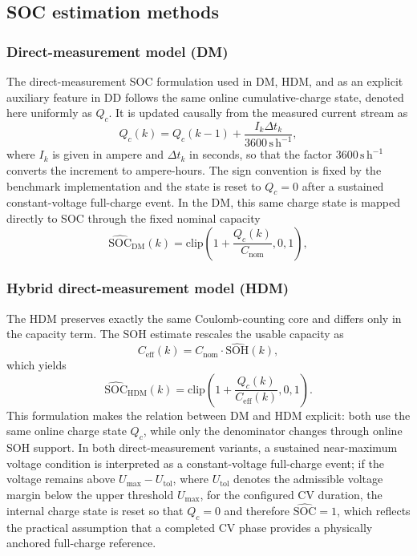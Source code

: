 \documentclass[review,nopreprintline]{elsarticle}
\begin{document}
\subsection{SOC estimation methods}
\subsubsection{Direct-measurement model (DM)}
The direct-measurement SOC formulation used in DM, HDM, and as an explicit auxiliary feature in DD follows the same online cumulative-charge state, denoted here uniformly as $Q_c$. It is updated causally from the measured current stream as
\begin{equation}
    Q_c(k)=Q_c(k-1)+\frac{I_k \Delta t_k}{3600\,\mathrm{s\,h^{-1}}},
    \label{eq:qc_update}
\end{equation}
where $I_k$ is given in ampere and $\Delta t_k$ in seconds, so that the factor $3600\,\mathrm{s\,h^{-1}}$ converts the increment to ampere-hours. The sign convention is fixed by the benchmark implementation and the state is reset to $Q_c=0$ after a sustained constant-voltage full-charge event. In the DM, this same charge state is mapped directly to SOC through the fixed nominal capacity
\begin{equation}
    \widehat{\mathrm{SOC}}_{\mathrm{DM}}(k)=\mathrm{clip}\!\left(1+\frac{Q_c(k)}{C_{\mathrm{nom}}},0,1\right),
    \label{eq:soc_dm}
\end{equation}

\subsubsection{Hybrid direct-measurement model (HDM)}
The HDM preserves exactly the same Coulomb-counting core and differs only in the capacity term. The SOH estimate rescales the usable capacity as
\begin{equation}
    C_{\mathrm{eff}}(k)=C_{\mathrm{nom}} \cdot \widehat{\mathrm{SOH}}(k),
    \label{eq:ceff}
\end{equation}
which yields
\begin{equation}
    \widehat{\mathrm{SOC}}_{\mathrm{HDM}}(k)=\mathrm{clip}\!\left(1+\frac{Q_c(k)}{C_{\mathrm{eff}}(k)},0,1\right).
    \label{eq:soc_hdm}
\end{equation}
This formulation makes the relation between DM and HDM explicit: both use the same online charge state $Q_c$, while only the denominator changes through online SOH support. In both direct-measurement variants, a sustained near-maximum voltage condition is interpreted as a constant-voltage full-charge event; if the voltage remains above $U_{\max}-U_{\mathrm{tol}}$, where $U_{\mathrm{tol}}$ denotes the admissible voltage margin below the upper threshold $U_{\max}$, for the configured CV duration, the internal charge state is reset so that $Q_c=0$ and therefore $\widehat{\mathrm{SOC}}=1$, which reflects the practical assumption that a completed CV phase provides a physically anchored full-charge reference.
\end{document}
